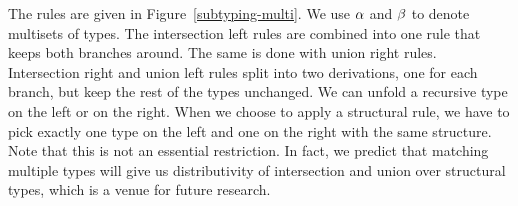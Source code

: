 \documentclass[a4paper,USenglish]{lipics-v2016}
\newcommand\lab{lab}
\begin{document}
The rules are given in Figure~\ref{subtyping-multi}. We use $\alpha$ and $\beta$ to denote multisets of types. The intersection left rules are combined into one rule that keeps both branches around. The same is done with union right rules. Intersection right and union left rules split into two derivations, one for each branch, but keep the rest of the types unchanged. We can unfold a recursive type on the left or on the right. When we choose to apply a structural rule, we have to pick exactly one type on the left and one on the right with the same structure. Note that this is not an essential restriction. In fact, we predict that matching multiple types will give us distributivity of intersection and union over structural types, which is a venue for future research.

\end{document}
